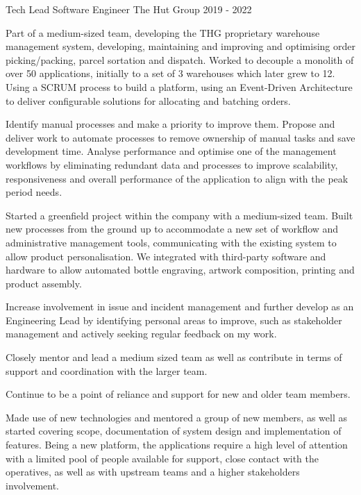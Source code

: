 \begin{cventries}

\cventry
    {Tech Lead Software Engineer} %
    {The Hut Group} %
    {} %
    {2019 - 2022} %
    {
    \begin{cvitems}
        \item{Part of a medium-sized team, developing the THG proprietary warehouse management system, developing, maintaining and improving and optimising order picking/packing, parcel sortation and dispatch. Worked to decouple a monolith of over 50 applications, initially to a set of 3 warehouses which later grew to 12. Using a SCRUM process to build a platform, using an Event-Driven Architecture to deliver configurable solutions for allocating and batching orders.}
        \item{Identify manual processes and make a priority to improve them. Propose and deliver work to automate processes to remove ownership of manual tasks and save development time. Analyse performance and optimise one of the management workflows by eliminating redundant data and processes to improve scalability, responsiveness and overall performance of the application to align with the peak period needs.}
        \item{Started a greenfield project within the company with a medium-sized team. Built new processes from the ground up to accommodate a new set of workflow and administrative management tools, communicating with the existing system to allow product personalisation. We integrated with third-party software and hardware to allow automated bottle engraving, artwork composition, printing and product assembly.}
        \item{Increase involvement in issue and incident management and further develop as an Engineering Lead by identifying personal areas to improve, such as stakeholder management and actively seeking regular feedback on my work.}
        \item{Closely mentor and lead a medium sized team as well as contribute in terms of support and coordination with the larger team.}
        \item{Continue to be a point of reliance and support for new and older team members.}
        \item{Made use of new technologies and mentored a group of new members, as well as started covering scope, documentation of system design and implementation of features. Being a new platform, the applications require a high level of attention with a limited pool of people available for support, close contact with the operatives, as well as with upstream teams and a higher stakeholders involvement.}

\end{cvitems}}
\end{cventries}
